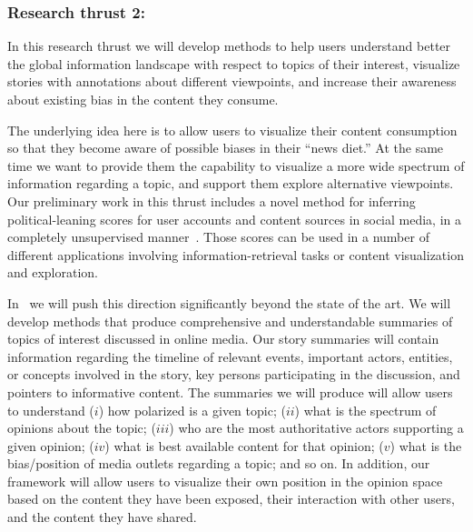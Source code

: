 \documentclass[a4paper,11pt]{article}
\begin{document}
\subsubsection*{Research thrust 2: \explore}

\noindent
\hspace{-3mm}\colorbox{verylightmagenta}{
\begin{minipage}{\textwidth}
In this research thrust we will develop methods to help users 
understand better the global information landscape with respect to topics of their interest, 
visualize stories with annotations about different viewpoints, and 
increase their awareness about existing bias in the content they consume.
\end{minipage}}

\medskip
The underlying idea here is to allow users to visualize their content consumption
so that they become aware of possible biases in their ``news diet.'' 
At the same time we want to provide them the capability to visualize 
a more wide spectrum of information regarding a topic,
and support them explore alternative viewpoints.
Our preliminary work in this thrust
includes a novel method for inferring political-leaning scores
for user accounts and content sources in social media, 
in a completely unsupervised manner~\cite{lahoti2018joint}.
Those scores can be used in a number of different applications
involving information-retrieval tasks or content visualization and exploration.

\smallskip
In \acronym\ we will push this direction significantly beyond the state of the art. 
We will develop methods that produce comprehensive and understandable summaries 
of topics of interest discussed in online media. 
Our story summaries will contain information regarding the timeline of relevant events, 
important actors, entities, or concepts involved in the story, 
key persons participating in the discussion, and 
pointers to informative content. 
The summaries we will produce will allow users to understand
($i$) how polarized is a given topic;
($ii$) what is the spectrum of opinions about the topic;
($iii$) who are the most authoritative actors supporting a given opinion; 
($iv$) what is best available content for that opinion;
($v$) what is the bias/position of media outlets regarding a topic; 
and so on. 
In addition, our framework will allow users to visualize their own position in the opinion space
based on the content they have been exposed, 
their interaction with other users, and the content they have shared.
\end{document}
